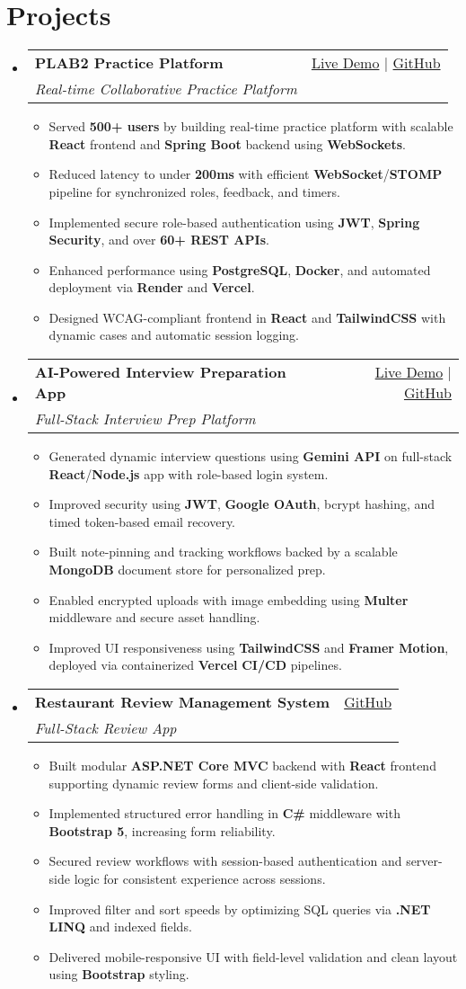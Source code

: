 \documentclass[letterpaper,10pt]{article}
\makeatletter
\newcommand{\resumeItem}[1]{\item\small{#1 \vspace{-2pt}}}
\newcommand{\resumeSubheading}[4]{
  \vspace{-1pt}\item
    \begin{tabular*}{0.97\textwidth}[t]{l@{\extracolsep{\fill}}r}
      \textbf{#1} & #2 \\
      \textit{\small#3} & \textit{\small #4} \\
    \end{tabular*}\vspace{-5pt}
}
\newcommand{\resumeSubHeadingListStart}{\begin{itemize}[leftmargin=*]}
\newcommand{\resumeSubHeadingListEnd}{\end{itemize}}
\newcommand{\resumeItemListStart}{\begin{itemize}}
\newcommand{\resumeItemListEnd}{\end{itemize}\vspace{-5pt}}
\makeatother
\begin{document}
\section{Projects}
  \resumeSubHeadingListStart
    \resumeSubheading
      {\textbf{PLAB2 Practice Platform}}{\href{https://plab2practice.com}{Live Demo} | \href{https://github.com/altansaid/plab2projectnew}{GitHub}}
      {Real-time Collaborative Practice Platform}{}
      \resumeItemListStart
        \resumeItem{Served \textbf{500+ users} by building real-time practice platform with scalable \textbf{React} frontend and \textbf{Spring Boot} backend using \textbf{WebSockets}.}
        \resumeItem{Reduced latency to under \textbf{200ms} with efficient \textbf{WebSocket}/\textbf{STOMP} pipeline for synchronized roles, feedback, and timers.}
        \resumeItem{Implemented secure role-based authentication using \textbf{JWT}, \textbf{Spring Security}, and over \textbf{60+ REST APIs}.}
        \resumeItem{Enhanced performance using \textbf{PostgreSQL}, \textbf{Docker}, and automated deployment via \textbf{Render} and \textbf{Vercel}.}
        \resumeItem{Designed WCAG-compliant frontend in \textbf{React} and \textbf{TailwindCSS} with dynamic cases and automatic session logging.}
      \resumeItemListEnd

    \resumeSubheading
      {\textbf{AI-Powered Interview Preparation App}}{\href{https://interviewcoach-ai.vercel.app}{Live Demo} | \href{https://github.com/altansaid/interviewcoach-ai}{GitHub}}
      {Full-Stack Interview Prep Platform}{}
      \resumeItemListStart
        \resumeItem{Generated dynamic interview questions using \textbf{Gemini API} on full-stack \textbf{React}/\textbf{Node.js} app with role-based login system.}
        \resumeItem{Improved security using \textbf{JWT}, \textbf{Google OAuth}, bcrypt hashing, and timed token-based email recovery.}
        \resumeItem{Built note-pinning and tracking workflows backed by a scalable \textbf{MongoDB} document store for personalized prep.}
        \resumeItem{Enabled encrypted uploads with image embedding using \textbf{Multer} middleware and secure asset handling.}
        \resumeItem{Improved UI responsiveness using \textbf{TailwindCSS} and \textbf{Framer Motion}, deployed via containerized \textbf{Vercel} \textbf{CI/CD} pipelines.}
      \resumeItemListEnd

    \resumeSubheading
      {\textbf{Restaurant Review Management System}}{\href{https://github.com/altansaid/restaurantreviewmanagementsystem}{GitHub}}{Full-Stack Review App}{}
      \resumeItemListStart
        \resumeItem{Built modular \textbf{ASP.NET Core MVC} backend with \textbf{React} frontend supporting dynamic review forms and client-side validation.}
        \resumeItem{Implemented structured error handling in \textbf{C\#} middleware with \textbf{Bootstrap 5}, increasing form reliability.}
        \resumeItem{Secured review workflows with session-based authentication and server-side logic for consistent experience across sessions.}
        \resumeItem{Improved filter and sort speeds by optimizing SQL queries via \textbf{.NET LINQ} and indexed fields.}
        \resumeItem{Delivered mobile-responsive UI with field-level validation and clean layout using \textbf{Bootstrap} styling.}
      \resumeItemListEnd
  \resumeSubHeadingListEnd
\end{document}
